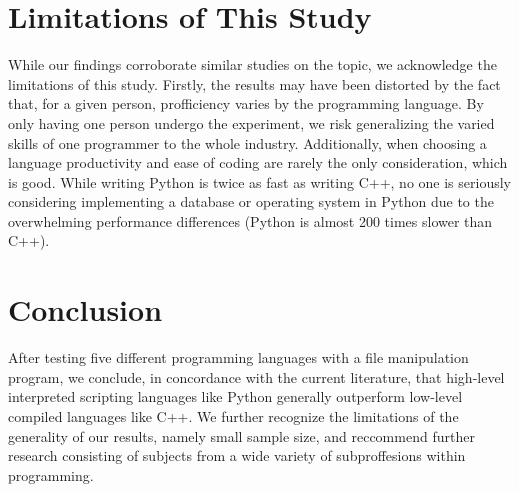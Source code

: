 \documentclass{article}
\begin{document}
\section{Limitations of This Study}

While our findings corroborate similar studies on the topic, we acknowledge the limitations of this study. Firstly, the results may have been distorted by the fact that, for a given person, profficiency varies by the programming language. By only having one person undergo the experiment, we risk generalizing the varied skills of one programmer to the whole industry. Additionally, when choosing a language productivity and ease of coding are rarely the only consideration, which is good. While writing Python is twice as fast as writing C++, no one is seriously considering implementing a database or operating system in Python due to the overwhelming performance differences (Python is almost 200 times slower than C++).
\section{Conclusion}

After testing five different programming languages with a file manipulation program, we conclude, in concordance with the current literature, that high-level interpreted scripting languages like Python generally outperform low-level compiled languages like C++. We further recognize the limitations of the generality of our results, namely small sample size, and reccommend further research consisting of subjects from a wide variety of subproffesions within programming.

\printbibliography
\end{document}
